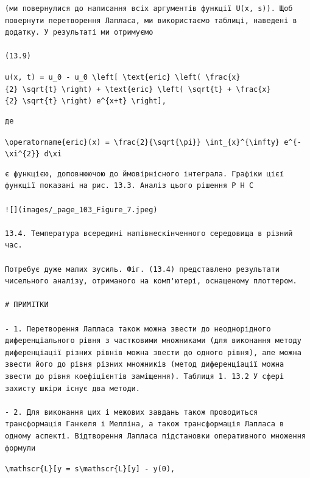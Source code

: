 \documentclass[
  ukrainian,
]{article}
\begin{document}
\begin{verbatim}
(ми повернулися до написання всіх аргументів функції U(x, s)). Щоб повернути перетворення Лапласа, ми використаємо таблиці, наведені в додатку. У результаті ми отримуємо

(13.9)
\end{verbatim}

\texttt{u(x,\ t)\ =\ u\_0\ -\ u\_0\ \textbackslash{}left{[}\ \textbackslash{}text\{eric\}\ \textbackslash{}left(\ \textbackslash{}frac\{x\}\{2\}\ \textbackslash{}sqrt\{t\}\ \textbackslash{}right)\ +\ \textbackslash{}text\{eric\}\ \textbackslash{}left(\ \textbackslash{}sqrt\{t\}\ +\ \textbackslash{}frac\{x\}\{2\}\ \textbackslash{}sqrt\{t\}\ \textbackslash{}right)\ e\^{}\{x+t\}\ \textbackslash{}right{]},}

\begin{verbatim}
де
\end{verbatim}

\texttt{\textbackslash{}operatorname\{eric\}(x)\ =\ \textbackslash{}frac\{2\}\{\textbackslash{}sqrt\{\textbackslash{}pi\}\}\ \textbackslash{}int\_\{x\}\^{}\{\textbackslash{}infty\}\ e\^{}\{-\textbackslash{}xi\^{}\{2\}\}\ d\textbackslash{}xi}

\begin{verbatim}
є функцією, доповнюючою до ймовірнісного інтеграла. Графіки цієї функції показані на рис. 13.3. Аналіз цього рішення P H C

![](images/_page_103_Figure_7.jpeg)

13.4. Температура всередині напівнескінченного середовища в різний час.

Потребує дуже малих зусиль. Фіг. (13.4) представлено результати чисельного аналізу, отриманого на комп'ютері, оснащеному плоттером.

# ПРИМІТКИ

- 1. Перетворення Лапласа також можна звести до неоднорідного диференціального рівня з частковими множниками (для виконання методу диференціації різних рівнів можна звести до одного рівня), але можна звести його до рівня різних множників (метод диференціації можна звести до рівня коефіцієнтів заміщення). Таблиця 1. 13.2 У сфері захисту шкіри існує два методи.

- 2. Для виконання цих і межових завдань також проводиться трансформація Ганкеля і Мелліна, а також трансформація Лапласа в одному аспекті. Відтворення Лапласа підстановки оперативного множення формули
\end{verbatim}

\texttt{\textbackslash{}mathscr\{L\}{[}y\textquotesingle{}{]}\ =\ s\textbackslash{}mathscr\{L\}{[}y{]}\ -\ y(0),}
\end{document}
